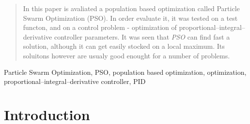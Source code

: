 \maketitle



\begin{abstract}
In this paper is avaliated a population based optimization called Particle Swarm Optimization (PSO). In order evaluate it, it was tested on a test functon, and on a control problem - optimization of proportional–integral–derivative controller parameters. It was seen that \textit{PSO} can find fast a solution, although it can get easily stocked on a local maximum. Its soluitons however are usualy good enought for a number of problems.
\end{abstract}


\begin{IEEEkeywords}
    Particle Swarm Optimization, PSO, population based optimization, optimization, proportional–integral–derivative controller, PID
\end{IEEEkeywords}






%
\IEEEpeerreviewmaketitle




\section{Introduction}

